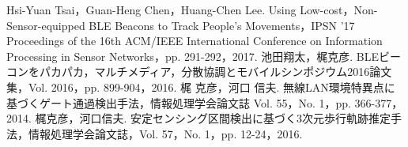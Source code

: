 \documentclass[Japanese]{dicomopapers}
\begin{document}
\begin{thebibliography}{20}
    Hsi-Yuan Tsai，Guan-Heng Chen，Huang-Chen Lee. Using Low-cost，Non-Sensor-equipped BLE Beacons to Track People's Movements，IPSN '17 Proceedings of the 16th ACM/IEEE International Conference on Information Processing in Sensor Networks，pp. 291-292，2017.
    池田翔太，梶克彦. BLEビーコンをパカパカ，マルチメディア，分散協調とモバイルシンポジウム2016論文集，Vol. 2016，pp. 899-904，2016.
    梶 克彦，河口 信夫. 無線LAN環境特異点に基づくゲート通過検出手法，情報処理学会論文誌 Vol. 55，No. 1，pp. 366-377，2014.
    梶克彦，河口信夫. 安定センシング区間検出に基づく3次元歩行軌跡推定手法，情報処理学会論文誌，Vol. 57，No. 1，pp. 12-24，2016.

\end{thebibliography}
\end{document}

